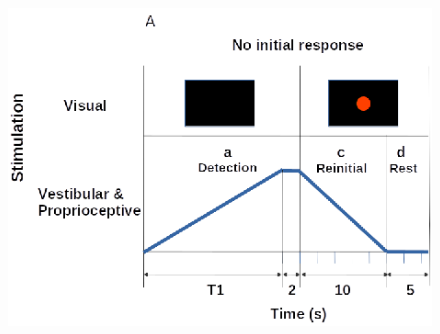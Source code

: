
\begin{figure}[htp]
\begin{center}
\includegraphics[width=0.9\linewidth]{figures/figure2A.eps}
\end{center}
\end{figure}


